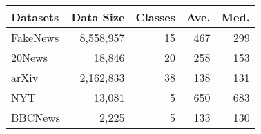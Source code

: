 \small
\begin{tabular}{l|rrrr}
\toprule
Datasets   & Data Size  & Classes & Ave.   &  Med. \\
\midrule
FakeNews &8,558,957 &15 &467 &299 \\
20News &18,846 &20 &258 &153 \\
arXiv &2,162,833 &38 &138 &131 \\
NYT &13,081 &5 &650 &683 \\
BBCNews &2,225 &5 &133 &130 \\
\bottomrule
\end{tabular}